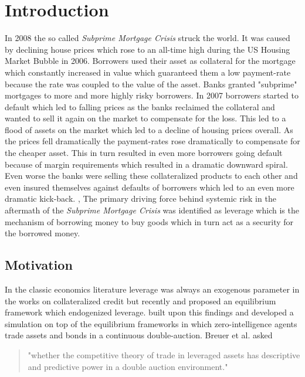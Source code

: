 \documentclass[Bachelorarbeit.tex]{subfiles}
\begin{document}
\chapter{Introduction}
In 2008 the so called \textit{Subprime Mortgage Crisis} struck the world. It was caused by declining house prices which rose to an all-time high during the US Housing Market Bubble in 2006. Borrowers used their asset as collateral for the mortgage which constantly increased in value which guaranteed them a low payment-rate because the rate was coupled to the value of the asset. Banks granted "subprime" mortgages to more and more highly risky borrowers. In 2007 borrowers started to default which led to falling prices as the banks reclaimed the collateral and wanted to sell it again on the market to compensate for the loss. This led to a flood of assets on the market which led to a decline of housing prices overall. As the prices fell dramatically the payment-rates rose dramatically to compensate for the cheaper asset. This in turn resulted in even more borrowers going default because of margin requirements which resulted in a dramatic downward spiral. Even worse the banks were selling these collateralized products to each other and even insured themselves against defaults of borrowers which led to an even more dramatic kick-back. \cite{SubprimeExplainedA}, \cite{SubprimeExplainedB}
\medskip
The primary driving force behind systemic risk in the aftermath of the \textit{Subprime Mortgage Crisis} was identified as leverage which is the mechanism of borrowing money to buy goods which in turn act as a security for the borrowed money.

\section{Motivation}
In the classic economics literature leverage was always an exogenous parameter in the works on collateralized credit but recently \cite{Geanakoplos2009} and \cite{GeanakoplosZame2014} proposed an equilibrium framework which endogenized leverage. \cite{Breuer2015} built upon this findings and developed a simulation on top of the equilibrium frameworks in which zero-intelligence agents trade assets and bonds in a continuous double-auction. Breuer et al. asked 

\begin{quote}
"whether the competitive theory of trade in leveraged assets has descriptive and predictive power in a double auction environment."
\end{quote}
\end{document}
